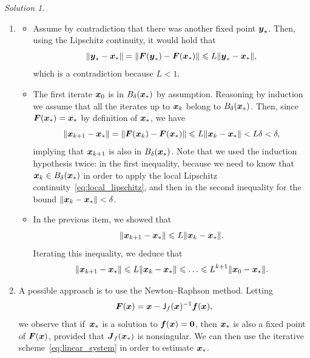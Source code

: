 \documentclass[11pt]{article}
\theoremstyle{definition}
\theoremstyle{remark}
\newtheorem*{solution}{Solution}
\begin{document}
\newpage
\begin{solution}
    $~$
    \begin{enumerate}
        \item {}
            \begin{itemize}

                \item
                    Assume by contradiction that there was another fixed point $\mathbf{\boldsymbol{y}}_*$.
                    Then, using the Lipschitz continuity, it would hold that
                    \[
                        \lVert\mathbf{\boldsymbol{y}}_* - \mathbf{\boldsymbol{x}}_*\rVert = \lVert\mathbf{\boldsymbol{F}}(\mathbf{\boldsymbol{y}}_*) - \mathbf{\boldsymbol{F}}(\mathbf{\boldsymbol{x}}_*)\rVert \leqslant L \lVert\mathbf{\boldsymbol{y}}_* - \mathbf{\boldsymbol{x}}_*\rVert,
                    \]
                    which is a contradiction because $L < 1$.

                \item
                    The first iterate $\mathbf{\boldsymbol{x}}_0$ is in $B_{\delta}(\mathbf{\boldsymbol{x}}_*)$ by assumption.
                    Reasoning by induction we assume that all the iterates up to $\mathbf{\boldsymbol{x}}_k$ belong to $B_{\delta}(\mathbf{\boldsymbol{x}}_*)$.
                    Then, since $\mathbf{\boldsymbol{F}}(\mathbf{\boldsymbol{x}}_*) = \mathbf{\boldsymbol{x}}_*$ by definition of $\mathbf{\boldsymbol{x}}_*$,
                    we have
                    \[
                        \lVert\mathbf{\boldsymbol{x}}_{k+1} - \mathbf{\boldsymbol{x}}_*\rVert = \lVert\mathbf{\boldsymbol{F}}(\mathbf{\boldsymbol{x}}_{k}) - \mathbf{\boldsymbol{F}}(\mathbf{\boldsymbol{x}}_*)\rVert \leqslant L \lVert\mathbf{\boldsymbol{x}}_{k} - \mathbf{\boldsymbol{x}}_*\rVert < L \delta < \delta,
                    \]
                    implying that $\mathbf{\boldsymbol{x}}_{k+1}$ is also in $B_{\delta}(\mathbf{\boldsymbol{x}}_*)$.
                    Note that we used the induction hypothesis twice: in the first inequality,
                    because we need to know that $\mathbf{\boldsymbol{x}}_k \in B_{\delta}(\mathbf{\boldsymbol{x}}_*)$ in order to apply the local Lipschitz continuity~\eqref{eq:local_lipschitz},
                    and then in the second inequality for the bound $\lVert\mathbf{\boldsymbol{x}}_{k} - \mathbf{\boldsymbol{x}}_*\rVert < \delta$.

                \item
                    In the previous item, we showed that
                    \[
                        \lVert\mathbf{\boldsymbol{x}}_{k+1} - \mathbf{\boldsymbol{x}}_*\rVert \leqslant L \lVert\mathbf{\boldsymbol{x}}_{k} - \mathbf{\boldsymbol{x}}_*\rVert.
                    \]
                    Iterating this inequality,
                    we deduce that
                    \[
                        \lVert\mathbf{\boldsymbol{x}}_{k+1} - \mathbf{\boldsymbol{x}}_*\rVert \leqslant L \lVert\mathbf{\boldsymbol{x}}_{k} - \mathbf{\boldsymbol{x}}_*\rVert \leqslant \dotsc \leqslant L^{k+1} \lVert\mathbf{\boldsymbol{x}}_{0} - \mathbf{\boldsymbol{x}}_*\rVert.
                    \]
            \end{itemize}

        \item
            A possible approach is to use the Newton--Raphson method.
            Letting
            \[
                \mathbf{\boldsymbol{F}}(\mathbf{\boldsymbol{x}}) = \mathbf{\boldsymbol{x}} - \mathsf J_{f}(\mathbf{\boldsymbol{x}})^{-1} \mathbf{\boldsymbol{f}}(\mathbf{\boldsymbol{x}}),
            \]
            we observe that if~$\mathbf{\boldsymbol{x}}_*$ is a solution to $\mathbf{\boldsymbol{f}}(\mathbf{\boldsymbol{x}}) = \mathbf{\boldsymbol{0}}$,
            then $\mathbf{\boldsymbol{x}}_*$ is also a fixed point of $\mathbf{\boldsymbol{F}}(\mathbf{\boldsymbol{x}})$,
            provided that $\mathbf{\boldsymbol{J}}_{f}(\mathbf{\boldsymbol{x}}_*)$ is nonsingular.
            We can then use the iterative scheme~\eqref{eq:linear_system} in order to estimate $\mathbf{\boldsymbol{x}}_*$.


\end{enumerate}
\end{solution}
\end{document}
